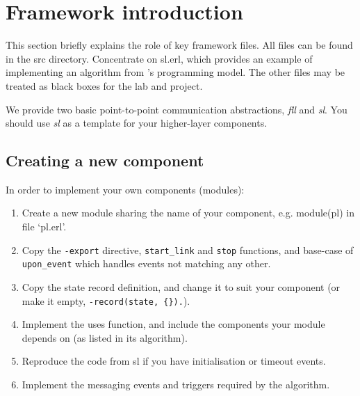\documentclass[a4paper]{article}
\begin{document}



\section{Framework introduction} %
\label{sec:framework_overview}

This section briefly explains the role of key framework files. All files can
be found in the src directory. Concentrate on sl.erl, which provides
an example of implementing an algorithm from \cite{cachin2011}'s programming
model. The other files may be treated as black boxes for the lab and
project.

We provide two basic point-to-point communication abstractions,
\emph{fll} and \emph{sl}. You should use \emph{sl} as a template for your
higher-layer components.

\subsection{Creating a new component} %
\label{sub:creating_a_new_component}

In order to implement your own components (modules):

\begin{enumerate}

\item Create a new module sharing the name of your component, e.g. module(pl)
in file `pl.erl'.

\item Copy the \verb!-export! directive, \verb!start_link! and \verb!stop!
functions, and base-case of \verb!upon_event! which handles events not
matching any other.

\item Copy the state record definition, and change it to suit your component
(or make it empty, \verb!-record(state, {}).!).

\item Implement the uses function, and include the components your module
depends on (as listed in its algorithm).

\item Reproduce the code from sl if you have initialisation or timeout events.

\item Implement the messaging events and triggers required by the algorithm.

\end{enumerate}
\end{document}
